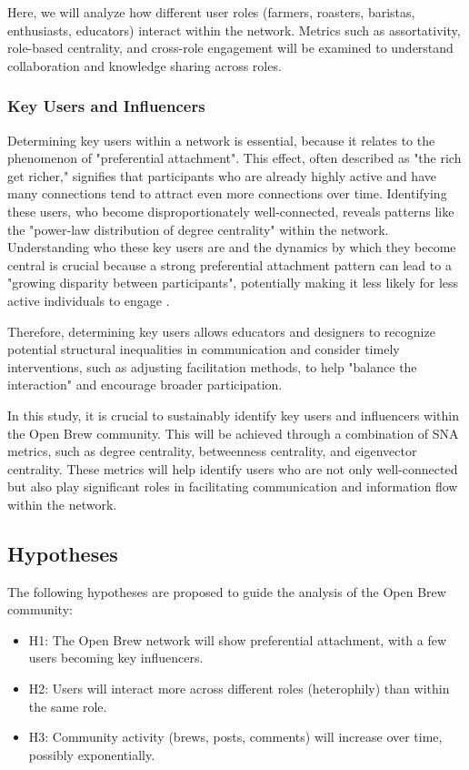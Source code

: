 \documentclass[12pt]{article}
\begin{document}
Here, we will analyze how different user roles (farmers, roasters, baristas, enthusiasts, educators) interact within the network. Metrics such as assortativity, role-based centrality, and cross-role engagement will be examined to understand collaboration and knowledge sharing across roles.

\subsubsection{Key Users and Influencers}
\label{subsubsection:key_users_and_influencers}
Determining key users within a network is essential, because it relates to the phenomenon of "preferential attachment". This effect, often described as "the rich get richer," signifies that participants who are already highly active and have many connections tend to attract even more connections over time. Identifying these users, who become disproportionately well-connected, reveals patterns like the "power-law distribution of degree centrality" within the network. Understanding who these key users are and the dynamics by which they become central is crucial because a strong preferential attachment pattern can lead to a "growing disparity between participants", potentially making it less likely for less active individuals to engage \cite{stepanyan2014culture}.

Therefore, determining key users allows educators and designers to recognize potential structural inequalities in communication and consider timely interventions, such as adjusting facilitation methods, to help "balance the interaction" and encourage broader participation.

In this study, it is crucial to sustainably identify key users and influencers within the Open Brew community. This will be achieved through a combination of SNA metrics, such as degree centrality, betweenness centrality, and eigenvector centrality. These metrics will help identify users who are not only well-connected but also play significant roles in facilitating communication and information flow within the network.

\subsection{Hypotheses}
\label{subsection:hypotheses}
The following hypotheses are proposed to guide the analysis of the Open Brew community:
\begin{itemize}
    \item H1: The Open Brew network will show preferential attachment, with a few users becoming key influencers.
    \item H2: Users will interact more across different roles (heterophily) than within the same role.
    \item H3: Community activity (brews, posts, comments) will increase over time, possibly exponentially.
\end{itemize}
\end{document}
